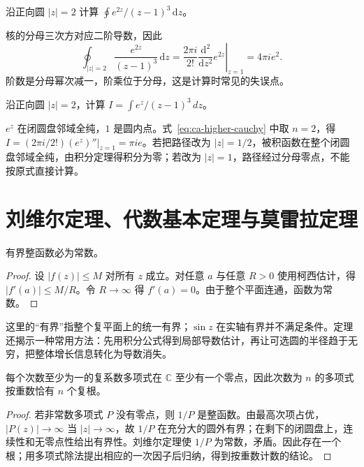 \begin{example}[高阶核的积分]
沿正向圆 $|z|=2$ 计算 $\oint e^{2z}/(z-1)^3\,\mathrm dz$。
\end{example}
\begin{solve}
核的分母三次方对应二阶导数，因此
\[
 \oint_{|z|=2}\frac{e^{2z}}{(z-1)^3}\,\mathrm dz
 =\frac{2\pi i}{2!}\left.\frac{\mathrm d^2}{\mathrm dz^2}e^{2z}\right|_{z=1}
 =4\pi i e^2.
\]
阶数是分母幂次减一，阶乘位于分母，这是计算时常见的失误点。
\end{solve}

\begin{example}[用导数公式计算积分]
沿正向圆 $|z|=2$，计算 $I=\int e^z/(z-1)^3\,dz$。
\end{example}
\begin{solve}
$e^z$ 在闭圆盘邻域全纯，$1$ 是圆内点。式~\eqref{eq:ca-higher-cauchy} 中取 $n=2$，得 $I=(2\pi i/2!)(e^z)''|_{z=1}=\pi i e$。若把路径改为 $|z|=1/2$，被积函数在整个闭圆盘邻域全纯，由积分定理得积分为零；若改为 $|z|=1$，路径经过分母零点，不能按原式直接计算。
\end{solve}

\section{刘维尔定理、代数基本定理与莫雷拉定理}

\begin{theorem}[刘维尔定理]
\label{thm:ca-liouville}
有界整函数必为常数。
\end{theorem}
\begin{proof}
设 $|f(z)|\le M$ 对所有 $z$ 成立。对任意 $a$ 与任意 $R>0$ 使用柯西估计，得 $|f'(a)|\le M/R$。令 $R\to\infty$ 得 $f'(a)=0$。由于整个平面连通，函数为常数。
\end{proof}

这里的“有界”指整个复平面上的统一有界；$\sin z$ 在实轴有界并不满足条件。定理还揭示一种常用方法：先用积分公式得到局部导数估计，再让可选圆的半径趋于无穷，把整体增长信息转化为导数消失。

\begin{theorem}[代数基本定理]
\label{thm:ca-fta}
每个次数至少为一的复系数多项式在 $\mathbb C$ 至少有一个零点，因此次数为 $n$ 的多项式按重数恰有 $n$ 个复根。
\end{theorem}
\begin{proof}
若非常数多项式 $P$ 没有零点，则 $1/P$ 是整函数。由最高次项占优，$|P(z)|\to\infty$ 当 $|z|\to\infty$，故 $1/P$ 在充分大的圆外有界；在剩下的闭圆盘上，连续性和无零点性给出有界性。刘维尔定理使 $1/P$ 为常数，矛盾。因此存在一个根；用多项式除法提出相应的一次因子后归纳，得到按重数计数的结论。
\end{proof}

